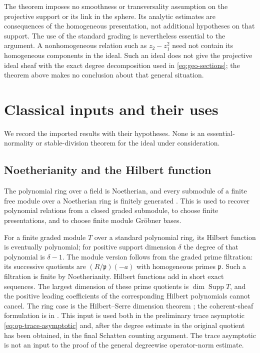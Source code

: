 \documentclass[11pt,reqno]{amsart}
\numberwithin{equation}{section}
\theoremstyle{definition}
\theoremstyle{remark}
\DeclareMathOperator{\Supp}{Supp}
\begin{document}
The theorem imposes no smoothness or transversality assumption on
the projective support or its link in the sphere.  Its analytic
estimates are consequences of the homogeneous presentation, not
additional hypotheses on that support.  The use of the standard
grading is nevertheless essential to the argument.  A
nonhomogeneous relation such as $z_2-z_1^2$ need not contain its
homogeneous components in the ideal.  Such an ideal does not give
the projective ideal sheaf with the exact degree decomposition used
in \eqref{eq:geo-sections}; the theorem above makes no conclusion
about that general situation.


\appendix

\section{Classical inputs and their uses}
\label{sec:classical-inputs}

We record the imported results with their hypotheses.  None is an
essential-normality or stable-division theorem for the ideal under
consideration.

\subsection{Noetherianity and the Hilbert function}
The polynomial ring over a field is Noetherian, and every submodule of
a finite free module over a Noetherian ring is finitely generated
\cite{StacksNoetherian}.  This is used to recover polynomial relations
from a closed graded submodule, to choose finite presentations, and
to choose finite module Gr\"obner bases.

For a finite graded module $T$ over a standard polynomial ring, its
Hilbert function is eventually polynomial; for positive support
dimension $\delta$ the degree of that polynomial is $\delta-1$.
The module version follows from the graded prime filtration: its
successive quotients are $(R/\mathfrak p)(-a)$ with homogeneous
primes $\mathfrak p$.  Such a filtration is finite by Noetherianity.
Hilbert functions add in short exact sequences.  The largest dimension
of these prime quotients is $\dim\Supp T$, and the positive leading
coefficients of the corresponding Hilbert polynomials cannot cancel.
The ring case is the Hilbert--Serre dimension theorem
\cite{StacksHilbert}; the coherent-sheaf formulation is in
\cite{SerreFAC}. This input is used both in the preliminary trace
asymptotic \eqref{eq:op-trace-asymptotic} and, after the degree estimate
in the original quotient has been obtained, in the final Schatten
counting argument. The trace asymptotic is not an input to the proof of
the general degreewise operator-norm estimate.
\end{document}
